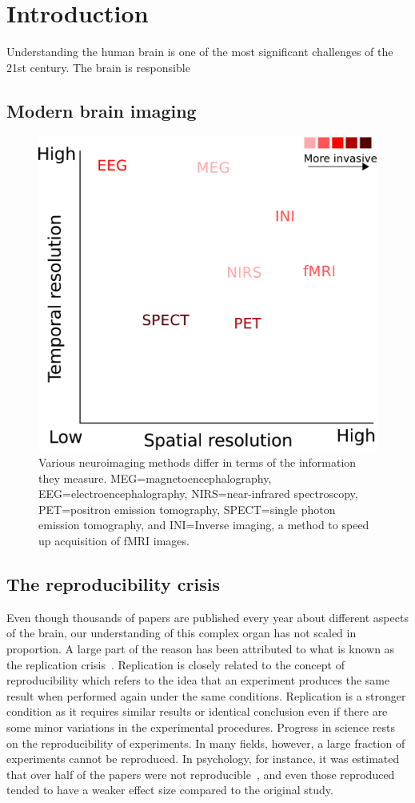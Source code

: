 \chapter{Introduction}

Understanding the human brain is one of the most significant challenges of the 21st century. The brain is responsible

\section{Modern brain imaging}

\begin{figure}[htb]
\begin{center}
   \includegraphics[width=0.4\linewidth]{figures/neuroimaging_methods.pdf}
\end{center}
   \caption{Various neuroimaging methods differ in terms of the information they measure. MEG=magnetoencephalography, EEG=electroencephalography, NIRS=near-infrared spectroscopy, PET=positron emission tomography, SPECT=single photon emission tomography, and INI=Inverse imaging, a method to speed up acquisition of fMRI images.}
   \label{fig:neuroimaging_methods}
\end{figure}

\section{The reproducibility crisis}

Even though thousands of papers are published every year about different aspects of the brain, our understanding of this complex organ has not scaled in proportion. A large part of the reason has been attributed to what is known as the replication crisis~\citep{ioannidis2005most, simmons2011false, button2013power}. Replication is closely related to the concept of reproducibility which refers to the idea that an experiment produces the same result when performed again under the same conditions. Replication is a stronger condition as it requires similar results or identical conclusion even if there are some minor variations in the experimental procedures. Progress in science rests on the reproducibility of experiments. In many fields, however, a large fraction of experiments cannot be reproduced. In psychology, for instance, it was estimated that over half of the papers were not reproducible~\citep{open2015estimating}, and even those reproduced tended to have a weaker effect size compared to the original study. 

